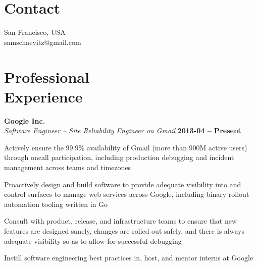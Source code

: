 \documentclass[margin,line]{resume}
\begin{document}
\begin{resume}

    \section{\mysidestyle Contact}

   San Francisco, USA             \\
   samschaevitz@gmail.com          \vspace{0mm}\\\vspace{-4.5mm}%

    \section{\mysidestyle Professional\\Experience}

    \textbf{Google Inc.} \vspace{1mm}\\\vspace{0mm}%
    \textsl{Software Engineer -- Site Reliability Engineer on Gmail} \hfill \textbf{2013-04 -- Present}
    \begin{list2}
		\item Actively ensure the 99.9\% availability of Gmail (more than 900M active users) through oncall participation, including production debugging and incident management across teams and timezones
    \item Proactively design and build software to provide adequate visibility into and control surfaces to manage web services across Google, including binary rollout automation tooling written in Go
		\item Consult with product, release, and infrastructure teams to ensure that new features are designed sanely, changes are rolled out safely, and there is always adequate visibility so as to allow for successful debugging
    \item Instill software engineering best practices in, host, and mentor interns at Google
    \end{list2}\vspace{-0.5mm}


\end{resume}
\end{document}
